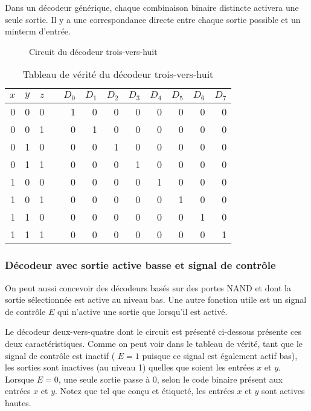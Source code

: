 \documentclass[11pt]{article}
\begin{document}
Dans un décodeur générique, chaque combinaison binaire distincte
activera une seule sortie. Il y a une correspondance directe entre
chaque sortie possible et un minterm d'entrée.

\begin{figure}[htbp]
\centering

\caption{\label{fig:org8c08764}Circuit du décodeur trois-vers-huit}
\end{figure}


\begin{table}[htbp]
\caption{\label{tab:org99771d1}Tableau de vérité du décodeur trois-vers-huit}
\centering
\begin{tabular}{rrrlrrrrrrrr}
\(x\) & \(y\) & \(z\) &  & \(D_0\) & \(D_1\) & \(D_2\) & \(D_3\) & \(D_4\) & \(D_5\) & \(D_6\) & \(D_7\)\\
\hline
0 & 0 & 0 &  & 1 & 0 & 0 & 0 & 0 & 0 & 0 & 0\\
0 & 0 & 1 &  & 0 & 1 & 0 & 0 & 0 & 0 & 0 & 0\\
0 & 1 & 0 &  & 0 & 0 & 1 & 0 & 0 & 0 & 0 & 0\\
0 & 1 & 1 &  & 0 & 0 & 0 & 1 & 0 & 0 & 0 & 0\\
1 & 0 & 0 &  & 0 & 0 & 0 & 0 & 1 & 0 & 0 & 0\\
1 & 0 & 1 &  & 0 & 0 & 0 & 0 & 0 & 1 & 0 & 0\\
1 & 1 & 0 &  & 0 & 0 & 0 & 0 & 0 & 0 & 1 & 0\\
1 & 1 & 1 &  & 0 & 0 & 0 & 0 & 0 & 0 & 0 & 1\\
\end{tabular}
\end{table}

\subsubsection{Décodeur avec sortie active basse et signal de contrôle}
\label{sec:org357a586}

On peut aussi concevoir des décodeurs basés sur des portes NAND et
dont la sortie sélectionnée est active au niveau bas. Une autre
fonction utile est un signal de contrôle \(E\) qui n'active une sortie
que lorsqu'il est activé.

Le décodeur deux-vers-quatre dont le circuit est présenté ci-dessous
présente ces deux caractéristiques. Comme on peut voir dans le tableau
de vérité, tant que le signal de contrôle est inactif ( \(E = 1\)
puisque ce signal est également actif bas), les sorties sont inactives
(au niveau 1) quelles que soient les entrées \(x\) et \(y\). Lorsque
\(E = 0\), une seule sortie passe à 0, selon le code binaire présent
aux entrées \(x\) et \(y\). Notez que tel que conçu et étiqueté, les
entrées \(x\) et \(y\) sont actives hautes.
\end{document}
